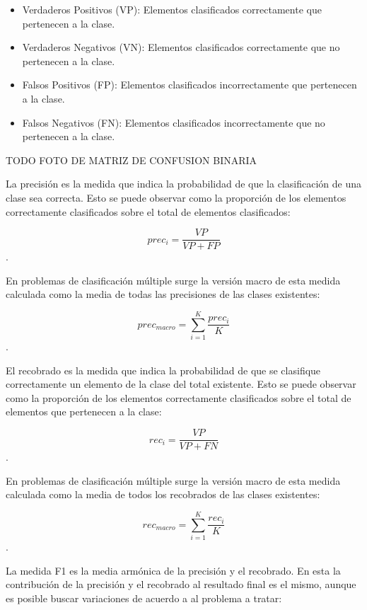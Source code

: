 \begin{itemize}
	\item Verdaderos Positivos (VP): Elementos clasificados correctamente que pertenecen a la clase.
	\item Verdaderos Negativos (VN): Elementos clasificados correctamente que no pertenecen a la clase.
	\item Falsos Positivos (FP): Elementos clasificados incorrectamente que pertenecen a la clase.
	\item Falsos Negativos (FN): Elementos clasificados incorrectamente que no pertenecen a la clase.
\end{itemize}

TODO FOTO DE MATRIZ DE CONFUSION BINARIA

La precisión es la medida que indica la probabilidad de que la clasificación de una clase sea correcta. Esto 
se puede observar como la proporción de los elementos correctamente clasificados sobre el total de 
elementos clasificados:

\begin{equation}
	prec_i = \frac{VP}{VP + FP}
\end{equation}.

En problemas de clasificación múltiple surge la versión macro de esta medida calculada como la media de todas
las precisiones de las clases existentes:

\begin{equation}
	prec_{macro} = \sum^K_{i=1} \frac{prec_i}{K}
\end{equation}.

El recobrado es la medida que indica la probabilidad de que se clasifique correctamente un elemento de la clase
del total existente. Esto se puede observar como la proporción de los elementos correctamente clasificados sobre el 
total de elementos que pertenecen a la clase:

\begin{equation}
	rec_i = \frac{VP}{VP + FN}
\end{equation}.

En problemas de clasificación múltiple surge la versión macro de esta medida calculada como la media de todos
los recobrados de las clases existentes:

\begin{equation}
	rec_{macro} = \sum^K_{i=1} \frac{rec_i}{K}
\end{equation}.

La medida F1 es la media armónica de la precisión y el recobrado. En esta la contribución de la precisión y el
recobrado al resultado final es el mismo, aunque es posible buscar variaciones de acuerdo a al problema a tratar:

